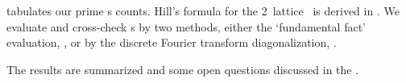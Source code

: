  tabulates our prime \po s counts. {Hill's formula} for
the 2\dmn\ lattice \catlatt\ is derived in .
We evaluate and cross-check  {\HillDet}s by two methods, either the
`fundamental fact' evaluation, , or by the
discrete Fourier transform diagonalization, .

The results are summarized and some open questions discussed in the
.
